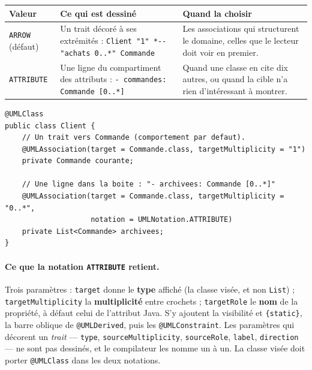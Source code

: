 \documentclass[12pt, a4paper]{article}
\begin{document}
\begin{center}
\begin{tabular}{@{}L{2.9cm}L{6.0cm}L{7.6cm}@{}}
\hline
\textbf{Valeur} & \textbf{Ce qui est dessiné} & \textbf{Quand la choisir} \\
\hline
\texttt{ARROW} \newline \small(défaut) & Un trait décoré à ses extrémités : \newline \texttt{Client "1" *-{}- "achats 0..*" Commande} & Les associations qui structurent le domaine, celles que le lecteur doit voir en premier. \\[0.4em]
\texttt{ATTRIBUTE} & Une ligne du compartiment des attributs : \newline \texttt{- commandes: Commande [0..*]} & Quand une classe en cite dix autres, ou quand la cible n'a rien d'intéressant à montrer. \\
\hline
\end{tabular}
\end{center}

\begin{lstlisting}
@UMLClass
public class Client {
    // Un trait vers Commande (comportement par defaut).
    @UMLAssociation(target = Commande.class, targetMultiplicity = "1")
    private Commande courante;

    // Une ligne dans la boite : "- archivees: Commande [0..*]"
    @UMLAssociation(target = Commande.class, targetMultiplicity = "0..*",
                    notation = UMLNotation.ATTRIBUTE)
    private List<Commande> archivees;
}
\end{lstlisting}

\paragraph{Ce que la notation \texttt{ATTRIBUTE} retient.} Trois paramètres : \texttt{target} donne le \textbf{type} affiché (la classe visée, et non \texttt{List}) ; \texttt{targetMultiplicity} la \textbf{multiplicité} entre crochets ; \texttt{targetRole} le \textbf{nom} de la propriété, à défaut celui de l'attribut Java. S'y ajoutent la visibilité et \texttt{\{static\}}, la barre oblique de \texttt{@UMLDerived}, puis les \texttt{@UMLConstraint}. Les paramètres qui décorent un \textit{trait} --- \texttt{type}, \texttt{sourceMultiplicity}, \texttt{sourceRole}, \texttt{label}, \texttt{direction} --- ne sont pas dessinés, et le compilateur les nomme un à un. La classe visée doit porter \texttt{@UMLClass} dans les deux notations.
\end{document}
